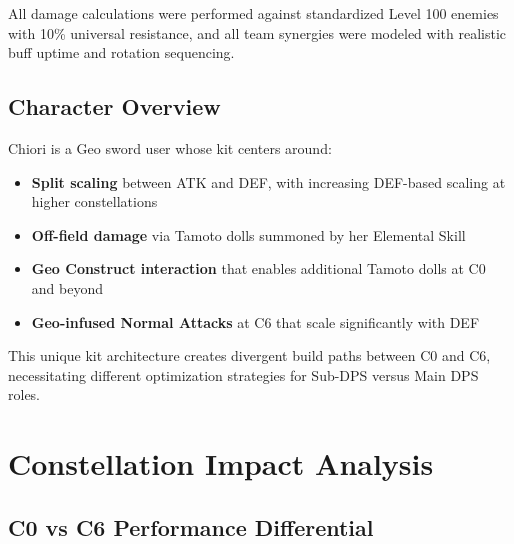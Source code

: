 \documentclass[12pt,a4paper]{article}
\begin{document}
All damage calculations were performed against standardized Level 100 enemies with 10\% universal resistance, and all team synergies were modeled with realistic buff uptime and rotation sequencing.

\subsection{Character Overview}

Chiori is a Geo sword user whose kit centers around:

\begin{itemize}
    \item \textbf{Split scaling} between ATK and DEF, with increasing DEF-based scaling at higher constellations
    \item \textbf{Off-field damage} via Tamoto dolls summoned by her Elemental Skill
    \item \textbf{Geo Construct interaction} that enables additional Tamoto dolls at C0 and beyond
    \item \textbf{Geo-infused Normal Attacks} at C6 that scale significantly with DEF
\end{itemize}

This unique kit architecture creates divergent build paths between C0 and C6, necessitating different optimization strategies for Sub-DPS versus Main DPS roles.

\section{Constellation Impact Analysis}

\subsection{C0 vs C6 Performance Differential}
\end{document}
